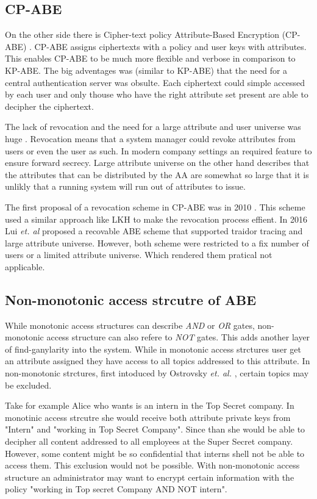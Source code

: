 \subsection{CP-ABE}
On the other side there is Cipher-text policy Attribute-Based Encryption (CP-ABE) \cite{bethencourt2007ciphertext}. CP-ABE assigns ciphertexts with a policy and user keys with attributes. This enables CP-ABE to be much more flexible and verbose in comparison to KP-ABE. The big adventages was (similar to KP-ABE) that the need for a central authentication server was obsulte. Each ciphertext could simple accessed by each user and only thouse who have the right attribute set present are able to decipher the ciphertext. 

The lack of revocation  and the need for a large attribute and user universe was huge . Revocation means that a system manager could revoke attributes from users or even the user as such. In modern company settings an required feature to ensure forward secrecy. Large attribute universe on the other hand describes that the attributes that can be distributed by the AA are somewhat so large that it is unlikly that a running system will run out of attributes to issue. 

The first proposal of a revocation scheme in CP-ABE was in 2010 \cite{liang2010ciphertext}. This scheme used a similar approach like LKH to make the revocation process effient. In 2016 Lui \textit{et. al} \cite{liu2016practical} proposed a recovable ABE scheme that supported traidor tracing and large attribute universe. However, both scheme were restricted to a fix number of users or a limited attribute universe. Which rendered them pratical not applicable.  

\subsection{Non-monotonic access strcutre of ABE}
While monotonic access structures can describe \textit{AND} or \textit{OR} gates, non-monotonic access structure can also refere to \textit{NOT} gates. This adds another layer of find-ganylarity into the system. While in monotonic access strctures user get an attribute assigned they have access to all topics addressed to this attribute. In non-monotonic strctures, first intoduced by Ostrovsky \textit{et. al.} \cite{Ostrovsky:2007:AEN:1315245.1315270}, certain topics may be excluded. 

Take for example Alice who wants is an intern in the Top Secret company. In monotinic access strcutre she would receive both attribute private keys from "Intern" and "working in Top Secret Company". Since than she would be able to decipher all content addressed to all employees at the Super Secret company. However, some content might be so confidential that interns shell not be able to access them. This exclusion would not be possible. With non-monotonic access structure an administrator may want to encrypt certain information with the policy "working in Top secret Company AND NOT intern".  

